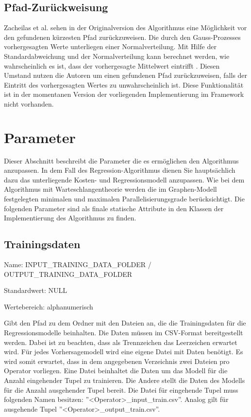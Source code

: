 \subsection{Pfad-Zurückweisung}

Zacheilas et al. sehen in der Originalversion des Algorithmus eine Möglichkeit vor den gefundenen kürzesten Pfad zurückzuweisen.
Die durch den Gauss-Prozesses vorhergesagten Werte unterliegen einer Normalverteilung.
Mit Hilfe der Standardabweichung und der Normalverteilung kann berechnet werden, wie wahrscheinlich es ist, dass der vorhergesagte Mittelwert eintrifft \cite{zacheilas_elastic_2015}.
Diesen Umstand nutzen die Autoren um einen gefundenen Pfad zurückzuweisen, falls der Eintritt des vorhergesagten Wertes zu unwahrscheinlich ist.
Diese Funktionalität ist in der momentanen Version der vorliegenden Implementierung im Framework nicht vorhanden.

\section{Parameter}

Dieser Abschnitt beschreibt die Parameter die es ermöglichen den Algorithmus anzupassen.
In dem Fall des Regression-Algorithmus dienen Sie hauptsächlich dazu das unterliegende Kosten- und Regressionsmodell anzupassen.
Wie bei dem Algorithmus mit Warteschlangentheorie werden die im Graphen-Modell festgelegten minimalen und maximalen Parallelisierungsgrade berücksichtigt.
Die folgenden Parameter sind als finale statische Attribute in den Klassen der Implementierung des Algorithmus zu finden.

\subsection{Trainingsdaten}

Name: INPUT\_TRAINING\_DATA\_FOLDER / OUTPUT\_TRAINING\_DATA\_FOLDER

Standardwert: NULL

Wertebereich: alphanumerisch

Gibt den Pfad zu dem Ordner mit den Dateien an, die die Trainingsdaten für die Regressionsmodelle beinhalten.
Die Daten müssen im CSV-Format bereitgestellt werden.
Dabei ist zu beachten, dass als Trennzeichen das Leerzeichen erwartet wird.
Für jedes Vorhersagemodell wird eine eigene Datei mit Daten benötigt.
Es wird somit erwartet, dass in dem angegebenen Verzeichnis zwei Dateien pro Operator vorliegen.
Eine Datei beinhaltet die Daten um das Modell für die Anzahl eingehender Tupel zu trainieren.
Die Andere stellt die Daten des Modells für die  Anzahl ausgehender Tupel bereit.
Die Datei für eingehende Tupel muss folgenden Namen besitzen: ''<Operator>\_input\_train.csv''.
Analog gilt für ausgehende Tupel ''<Operator>\_output\_train.csv''.


